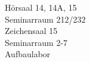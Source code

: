 \documentclass[a4paper]{article}
\begin{document}
\begin{center}
\begin{vsltext}{1.6cm}{2cm}
    Hörsaal 14, 14A, 15\\
    Seminarraum 212/232\\
    Zeichensaal 15\\
    Seminarraum 2-7\\
    Aufbaulabor\\
\end{vsltext}

\end{center}
\end{document}
